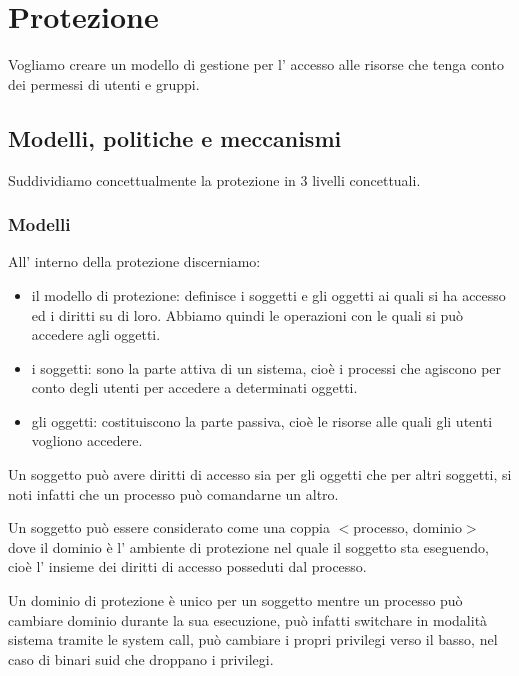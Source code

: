 \section{Protezione}
Vogliamo creare un modello di gestione per l' accesso alle risorse che tenga conto dei permessi di utenti e gruppi.

\subsection{Modelli, politiche e meccanismi}
Suddividiamo concettualmente la protezione in 3 livelli concettuali.

\subsubsection{Modelli}
All' interno della protezione discerniamo:
\begin{itemize}
    \item il modello di protezione: definisce i soggetti e gli oggetti ai quali si ha accesso ed i diritti su di loro.
    Abbiamo quindi le operazioni con le quali si può accedere agli oggetti.

    \item i soggetti: sono la parte attiva di un sistema, cioè i processi che agiscono per conto degli utenti per accedere a determinati oggetti.
    
    \item gli oggetti: costituiscono la parte passiva, cioè le risorse alle quali gli utenti vogliono accedere.
\end{itemize}
Un soggetto può avere diritti di accesso sia per gli oggetti che per altri soggetti, si noti infatti che un processo può comandarne un altro.

Un soggetto può essere considerato come una coppia $<$processo, dominio$>$ dove il dominio è l' ambiente di protezione nel quale il soggetto sta eseguendo, cioè l' insieme dei diritti di accesso posseduti dal processo.

Un dominio di protezione è unico per un soggetto mentre un processo può cambiare dominio durante la sua esecuzione, può infatti switchare in modalità sistema tramite le system call, può cambiare i propri privilegi verso il basso, nel caso di binari suid che droppano i privilegi.


